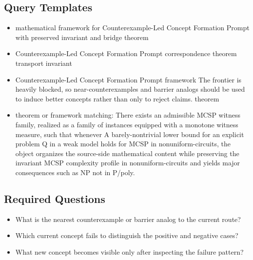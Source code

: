 \documentclass[11pt]{article}
\begin{document}
\subsection*{Query Templates}
\begin{itemize}[leftmargin=*,itemsep=0.2em]
\item mathematical framework for Counterexample-Led Concept Formation Prompt with preserved invariant and bridge theorem
\item Counterexample-Led Concept Formation Prompt correspondence theorem transport invariant
\item Counterexample-Led Concept Formation Prompt framework The frontier is heavily blocked, so near-counterexamples and barrier analogs should be used to induce better concepts rather than only to reject claims. theorem
\item theorem or framework matching: There exists an admissible MCSP witness family, realized as a family of instances equipped with a monotone witness measure, such that whenever A barely-nontrivial lower bound for an explicit problem Q in a weak model holds for MCSP in nonuniform-circuits, the object organizes the source-side mathematical content while preserving the invariant MCSP complexity profile in nonuniform-circuits and yields major consequences such as NP not in P/poly.
\end{itemize}
\subsection*{Required Questions}
\begin{itemize}[leftmargin=*,itemsep=0.2em]
\item What is the nearest counterexample or barrier analog to the current route?
\item Which current concept fails to distinguish the positive and negative cases?
\item What new concept becomes visible only after inspecting the failure pattern?
\end{itemize}
\end{document}
